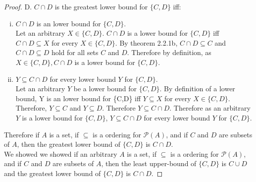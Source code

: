 \documentclass[a4paper,11pt]{article}
\begin{document}
{\begin{theorem1}
\begin{proof}
  D\).
  \newpage
      \noindent\(C \cap D\) is the greatest lower bound for \(\{C,D\}\) iff:
    \begin{enumerate}[(i)]
      \item \(C \cap D\) is an lower bound for \(\{C,D\}\).\\
      Let an arbitrary \(X \in \{C,D\}\). \(C \cap D\) is a lower bound for \(\{C,D\}\) iff \(C \cap D \subseteq X\) for every \(X \in \{C,D\}\). By theorem 2.2.1b, \(C \cap D \subseteq C\) and \(C \cap D \subseteq D\) hold for all sets \(C\) and \(D\). 
      Therefore by definition, as \(X \in \{C,D\}, C \cap D\) is a lower bound 
      for \(\{C,D\}\).
      \item \(Y \subseteq C \cap D\) for every lower bound \(Y\) for 
      \(\{C,D\}\).\\
      Let an arbitrary \(Y\) be a lower bound for \(\{C,D\}\). By definition of a 
      lower bound, Y is an lower bound for \{C,D\} iff \(Y \subseteq X\) for every \(X \in \{C,D\}\). 
      Therefore, \(Y \subseteq C\) and \(Y \subseteq D\). Therefore \(Y \subseteq 
      C \cap D\). Therefore as an arbitrary \(Y\) is a lower bound for \(\{C,D\}\), \(Y \subseteq C \cap D\) 
      for every lower bound \(Y\) for \(\{C,D\}\).
    \end{enumerate}
    Therefore if \(A\) is a set, if \(\subseteq\) is a ordering for \(\mathscr{P}{(A)}\), and if \(C\) and \(D\) are subsets of \(A\), then the greatest lower bound 
  of \(\{C,D\}\) is \(C \cap D\).\\
  We showed we showed if an arbitrary \(A\) is a set, if \(\subseteq\) is a ordering for \(\mathscr{P}{(A)}\), and if \(C\) and \(D\) are subsets of \(A\), then the least upper-bound 
  of \(\{C,D\}\) is \(C \cup D\) and the greatest lower bound of \(\{C,D\}\) is \(C \cap 
  D\).
  \end{proof}
\end{theorem1}
\newpage
\setcounter{ProblemCounter}{14}
}
\end{document}
